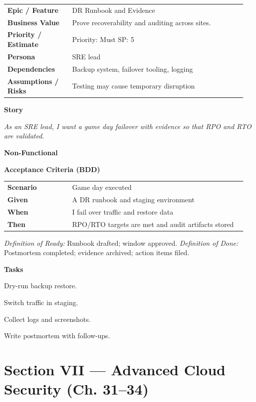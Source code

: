 \documentclass[11pt,letterpaper]{article}
\makeatletter
\newenvironment{kvtable}{%
  \par\noindent\begin{tabular}{@{}>{\raggedright\bfseries\arraybackslash}p{0.26\linewidth} >{\raggedright\arraybackslash}p{0.70\linewidth}@{}}
}{\end{tabular}\par}
\newenvironment{bdd}{%
  \par\noindent\begin{tabular}{@{}>{\raggedright\bfseries\arraybackslash}p{0.26\linewidth} >{\raggedright\arraybackslash}p{0.70\linewidth}@{}}
}{\end{tabular}\par}
\newcommand{\DoRDoD}[2]{%
  \vspace{0.35em}
  {\footnotesize\color{Muted}%
    \textit{Definition of Ready:} #1 \; \textbullet\;
    \textit{Definition of Done:} #2%
  }%
}
\newenvironment{storycard}[2]{%
  \begin{tcolorbox}[cloudcard, title={#1 --- #2}]%
}{\end{tcolorbox}}
\newcommand{\sectionlabel}[1]{\par\vspace{0.35em}\textbf{#1}\par}
\makeatother
\begin{document}
\begin{storycard}{CCS-30}{Ch. 30 — Availability, Recovery, \& Auditing}
\begin{kvtable}
Epic / Feature & DR Runbook and Evidence\\
Business Value & Prove recoverability and auditing across sites.\\
Priority / Estimate & Priority: Must \quad SP: 5\\
Persona & SRE lead\\
Dependencies & Backup system, failover tooling, logging\\
Assumptions / Risks & Testing may cause temporary disruption\\
\end{kvtable}
\sectionlabel{Story}
\textit{As an SRE lead, I want a game day failover with evidence so that RPO and RTO are validated.}
\sectionlabel{Non-Functional}\;
\sectionlabel{Acceptance Criteria (BDD)}
\begin{bdd}
Scenario & Game day executed\\
Given & A DR runbook and staging environment\\
When & I fail over traffic and restore data\\
Then & RPO/RTO targets are met and audit artifacts stored\\
\end{bdd}
\DoRDoD{Runbook drafted; window approved.}{Postmortem completed; evidence archived; action items filed.}
\sectionlabel{Tasks}
\begin{checklist}
\item Dry-run backup restore.
\item Switch traffic in staging.
\item Collect logs and screenshots.
\item Write postmortem with follow-ups.
\end{checklist}
\end{storycard}

\section{Section VII — Advanced Cloud Security (Ch. 31--34)}
\end{document}
